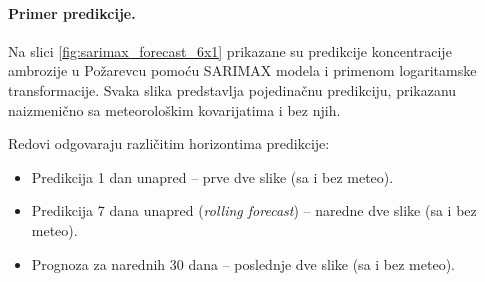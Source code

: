 \documentclass[12pt]{article}
\begin{document}
\begin{table}[h!]
\centering
\caption{Početak sezone polena: stvarni datum i predikcija 7 dana unapred (sa i bez meteo).}
\label{tab:start_season}
\end{table}




\paragraph{\textbf{Primer predikcije.}}  
Na slici \ref{fig:sarimax_forecast_6x1} prikazane su predikcije koncentracije ambrozije u Požarevcu pomoću SARIMAX modela i primenom logaritamske transformacije.  
Svaka slika predstavlja pojedinačnu predikciju, prikazanu naizmenično sa meteorološkim kovarijatima i bez njih.  

Redovi odgovaraju različitim horizontima predikcije:
\begin{itemize}
    \item Predikcija 1 dan unapred – prve dve slike (sa i bez meteo).
    \item Predikcija 7 dana unapred (\textit{rolling forecast}) – naredne dve slike (sa i bez meteo).
    \item Prognoza za narednih 30 dana – poslednje dve slike (sa i bez meteo).
\end{itemize}
\end{document}
